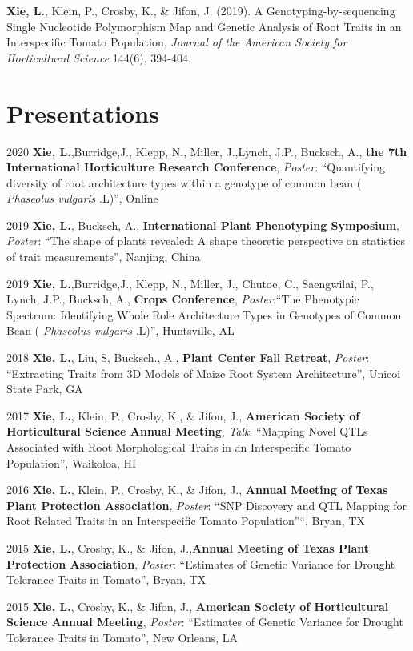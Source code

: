 \documentclass[11pt, a4paper]{awesome-cv}
\begin{document}
\textbf{Xie, L.}, Klein, P., Crosby, K., \& Jifon, J. (2019). A
Genotyping-by-sequencing Single Nucleotide Polymorphism Map and Genetic
Analysis of Root Traits in an Interspecific Tomato Population,
\emph{Journal of the American Society for Horticultural Science} 144(6),
394-404.

\section{Presentations}\label{presentations}

2020 \textbf{Xie, L.},Burridge,J., Klepp, N., Miller, J.,Lynch, J.P.,
Bucksch, A., \textbf{the 7th International Horticulture Research
Conference}, \emph{Poster}: ``Quantifying diversity of root architecture
types within a genotype of common bean ( \emph{Phaseolus vulgaris}
.L)'', Online

2019 \textbf{Xie, L.}, Bucksch, A., \textbf{International Plant
Phenotyping Symposium}, \emph{Poster}: ``The shape of plants revealed: A
shape theoretic perspective on statistics of trait measurements'',
Nanjing, China

2019 \textbf{Xie, L.},Burridge,J., Klepp, N., Miller, J., Chutoe, C.,
Saengwilai, P., Lynch, J.P., Bucksch, A., \textbf{Crops Conference},
\emph{Poster}:``The Phenotypic Spectrum: Identifying Whole Role
Architecture Types in Genotypes of Common Bean ( \emph{Phaseolus
vulgaris} .L)'', Huntsville, AL

2018 \textbf{Xie, L.}, Liu, S, Bucksch., A., \textbf{Plant Center Fall
Retreat}, \emph{Poster}: ``Extracting Traits from 3D Models of Maize
Root System Architecture'', Unicoi State Park, GA

2017 \textbf{Xie, L.}, Klein, P., Crosby, K., \& Jifon, J.,
\textbf{American Society of Horticultural Science Annual Meeting},
\emph{Talk}: ``Mapping Novel QTLs Associated with Root Morphological
Traits in an Interspecific Tomato Population'', Waikoloa, HI

2016 \textbf{Xie, L.}, Klein, P., Crosby, K., \& Jifon, J.,
\textbf{Annual Meeting of Texas Plant Protection Association},
\emph{Poster}: ``SNP Discovery and QTL Mapping for Root Related Traits
in an Interspecific Tomato Population''``, Bryan, TX

2015 \textbf{Xie, L.}, Crosby, K., \& Jifon, J.,\textbf{Annual Meeting
of Texas Plant Protection Association}, \emph{Poster}: ``Estimates of
Genetic Variance for Drought Tolerance Traits in Tomato'', Bryan, TX

2015 \textbf{Xie, L.}, Crosby, K., \& Jifon, J., \textbf{American
Society of Horticultural Science Annual Meeting}, \emph{Poster}:
``Estimates of Genetic Variance for Drought Tolerance Traits in
Tomato'', New Orleans, LA
\end{document}
